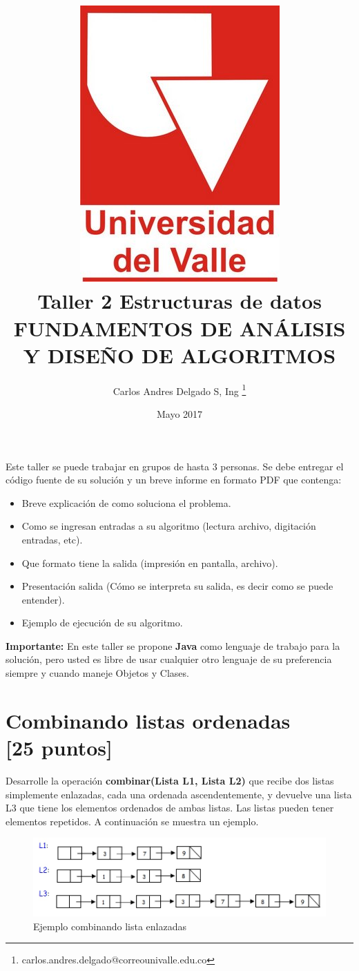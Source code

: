 \documentclass[twocolumn]{article}
\title{	\includegraphics[scale=0.2]{univalle.jpg} \\ Taller 2 Estructuras de datos\\FUNDAMENTOS DE ANÁLISIS Y DISEÑO DE ALGORITMOS}
\author{Carlos Andres Delgado S, Ing \footnote{ carlos.andres.delgado@correounivalle.edu.co }}
\date{Mayo 2017}
\begin{document}
\maketitle

Este taller se puede trabajar en grupos de hasta 3 personas. Se debe entregar el código fuente de su solución y un breve informe en formato PDF que contenga:

\begin{itemize}
	\item Breve explicación de como soluciona el problema.
	\item Como se ingresan entradas a su algoritmo (lectura archivo, digitación entradas, etc).
	\item Que formato tiene la salida (impresión en pantalla, archivo).
	\item Presentación salida (Cómo se interpreta su salida, es decir como se puede entender).
	\item Ejemplo de ejecución de su algoritmo.
\end{itemize}

\textbf{Importante:} En este taller se propone \textbf{Java} como lenguaje de trabajo para la solución, pero usted es libre de usar cualquier otro lenguaje de su preferencia siempre y cuando maneje Objetos y Clases.

\section{Combinando listas ordenadas \\ \small{[25 puntos]}}

Desarrolle la operación \textbf{combinar(Lista L1, Lista L2)} que recibe dos listas simplemente
enlazadas, cada una ordenada ascendentemente, y devuelve una lista L3 que tiene los
elementos ordenados de ambas listas. Las listas pueden tener elementos repetidos. A
continuación se muestra un ejemplo.

\begin{figure}[H]
	\centering
	\includegraphics[scale=0.4]{ListaEnlazada.jpg}
	\caption{Ejemplo combinando lista enlazadas}
\end{figure}
\end{document}
